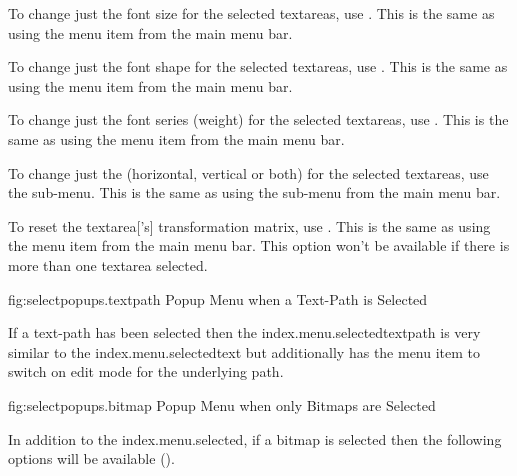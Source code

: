 
To change just the font size for the selected \glspl{textarea},
use . This is the same as using the
 menu item from the main menu bar.


To change just the font shape for the selected \glspl{textarea},
use . This is the same as using the
 menu item from the main menu bar.


To change just the font series (weight) for the selected \glspl{textarea},
use . This is the same as using the
 menu item from the main menu bar.


To change just the  (horizontal, vertical or both) for the
selected \glspl{textarea}, use the 
sub-menu. This is the same as using the
 sub-menu from the main menu
bar.


To reset the \gls{textarea}['s] transformation matrix, use 
. This is the same as using the 
 menu item from the main menu bar.
This option won't be available if there is more than one
\gls{textarea} selected.



\FloatFig
  {fig:selectpopups.textpath}
  {}
  {Popup Menu when a Text-Path is Selected}


If a text-path has been selected then the
\gls{index.menu.selectedtextpath} is very similar to the
\gls{index.menu.selectedtext} but additionally has the
 menu item to switch on edit mode for the
underlying path.



\FloatFig
  {fig:selectpopups.bitmap}
  {}
  {Popup Menu when only Bitmaps are Selected}

In addition to the \gls{index.menu.selected},
if a \gls{bitmap} is selected then the following options will be available
().

